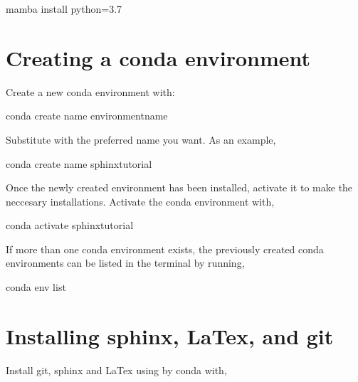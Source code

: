 \documentclass[letterpaper,10pt,english]{sphinxhowto}
\begin{document}
\begin{sphinxVerbatim}[commandchars=\\\{\}]
\PYGZdl{} mamba install python=3.7
\end{sphinxVerbatim}


\section{Creating a conda environment}
\label{\detokenize{index:creating-a-conda-environment}}
\sphinxAtStartPar
Create a new conda environment with:

\begin{sphinxVerbatim}[commandchars=\\\{\}]
\PYGZdl{} conda create \PYGZhy{}\PYGZhy{}name \PYGZlt{}environment\PYGZhy{}name\PYGZgt{}
\end{sphinxVerbatim}

\sphinxAtStartPar
Substitute  with the preferred name you want. As an example,

\begin{sphinxVerbatim}[commandchars=\\\{\}]
\PYGZdl{} conda create \PYGZhy{}\PYGZhy{}name sphinx\PYGZhy{}tutorial
\end{sphinxVerbatim}

\sphinxAtStartPar
Once the newly created environment has been installed, activate it to make the neccesary installations. Activate the conda environment with,

\begin{sphinxVerbatim}[commandchars=\\\{\}]
\PYGZdl{} conda activate sphinx\PYGZhy{}tutorial
\end{sphinxVerbatim}

\sphinxAtStartPar
If more than one conda environment exists, the previously created conda environments can be listed in the terminal by running,

\begin{sphinxVerbatim}[commandchars=\\\{\}]
\PYGZdl{} conda env list
\end{sphinxVerbatim}


\section{Installing sphinx, LaTex, and git}
\label{\detokenize{index:installing-sphinx-latex-and-git}}
\sphinxAtStartPar
Install git, sphinx and LaTex using by conda with,
\end{document}
